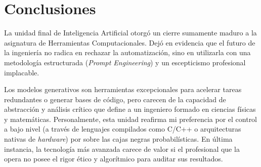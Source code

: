 \section{Conclusiones}

La unidad final de Inteligencia Artificial otorgó un cierre sumamente maduro a la asignatura de Herramientas Computacionales. Dejó en evidencia que el futuro de la ingeniería no radica en rechazar la automatización, sino en utilizarla con una metodología estructurada (\textit{Prompt Engineering}) y un escepticismo profesional implacable.

Los modelos generativos son herramientas excepcionales para acelerar tareas redundantes o generar bases de código, pero carecen de la capacidad de abstracción y análisis crítico que define a un ingeniero formado en ciencias físicas y matemáticas. Personalmente, esta unidad reafirma mi preferencia por el control a bajo nivel (a través de lenguajes compilados como C/C++ o arquitecturas nativas de \textit{hardware}) por sobre las cajas negras probabilísticas. En última instancia, la tecnología más avanzada carece de valor si el profesional que la opera no posee el rigor ético y algorítmico para auditar sus resultados.
